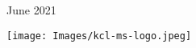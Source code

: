 \begin{titlepage}
	
	
	\vfill\vfill\vfill %
	
	{\large June 2021} %
	
	
	\vfill\vfill
	\texttt{[image: Images/kcl-ms-logo.jpeg]}\\[1cm] %
	 
	
	\vfill %
	
\end{titlepage}
